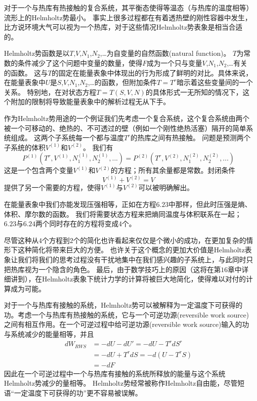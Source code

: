 对于一个与热库有热接触的复合系统，其平衡态使得等温态（与热库的温度相等）流形上的Helmholtz势最小。
事实上很多过程都在有着透热壁的刚性容器中发生，比方说环境大气可以视为一个热库，对于这些情况Helmholtz势表象是相当合适的。

 Helmholtz势函数是以$T$,$V$,$N_1$,$N_2$,…为自变量的自然函数(natural function)。
$T$为常数的条件减少了这个问题中变量的数量，使得$F$成为一个只与变量$V$,$N_1$,$N_2$,…有关的函数。
这与$T$的固定在能量表象中体现出的行为形成了鲜明的对比。具体来说，在能量表象中$U$是$S$,$V$,$N_1$,$N_2$,…的函数，但附加条件$T=T^r$暗示着这些变量间的一个关系。
特别地，在对状态方程$T=T(S, V, N)$的具体形式一无所知的情况下，这个附加的限制将导致能量表象中的解析过程无从下手。

作为Helmholtz势用途的一个例证我们先考虑一个复合系统，这个复合系统由两个被一个可移动的、绝热的、不可透过的壁（例如一个刚性绝热活塞）隔开的简单系统组成。
这两个子系统每一个都与温度$T^r$的热库之间有热接触。
问题是预测两个子系统的体积$V^{(1)}$和$V^{(2)}$。
我们有
\begin{equation}
\label{equ6.23}
P^{(1)}\left(T^r, V^{(1)}, N_1^{(1)}, N_2^{(1)}, ...\right)=P^{(2)}\left(T^r, V^{(2)}, N_1^{(2)}, N_2^{(2)}, ...\right)
\end{equation}
这是一个包含两个变量$V^{(1)}$和$V^{(2)}$的方程；所有其余量都是常数。封闭条件
\begin{equation}
\label{equ6.24}
V^{(1)}+V^{(2)}=V
\end{equation}
提供了另一个需要的方程，使得$V^{(1)}$与$V^{(2)}$可以被明确解出。

在能量表象中我们亦能发现压强相等，正如在方程$6.23$中那样，但此时压强是熵、体积、摩尔数的函数。
我们将需要状态方程来把熵同温度与体积联系在一起；$6.23$与$6.24$两个同时存在的方程将变成$4$个。

尽管这种从$4$个方程到$2$个的简化也许看起来仅仅是个微小的成功，在更加复杂的情形下这种简化将带来巨大的方便。
也许关于这个概念的更加大价值是Helmholtz表象让我们将我们的思考过程没有干扰地集中在我们感兴趣的子系统上，与此同时只把热库视为一个隐含的角色。
最后，由于数学技巧上的原因（这将在第$16$章中详细讲到），在Helmholtz表象下统计力学的计算将被巨大地简化，使得难以对付的计算成为可能。

对于一个与热库有接触的系统，Helmholtz势可以被解释为一定温度下可获得的功。考虑一个与热库有热接触的系统，它与一个可逆功源(reversible work source)之间有相互作用。在一个可逆过程中给可逆功源(reversible work source)输入的功与系统减少的能量相等，并且
\begin{align}
\label{equ6.25}
dW_{RWS}&=-dU-dU'=-dU-T^rdS^r \\
\label{equ6.26}
                  &=-dU+T^rdS=-d(U-T^rS) \\
\label{equ6.27}
                  &=-dF
\end{align}
因此在一个可逆过程中一个与热库有接触的系统所释放的能量与这个系统Helmholtz势减少的量相等。
Helmholtz势经常被称作Helmholtz自由能，尽管短语“一定温度下可获得的功”更不容易被误解。


